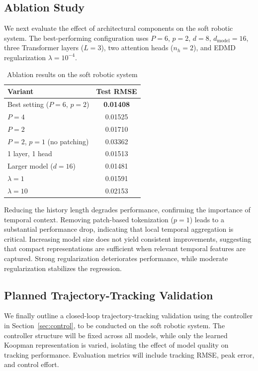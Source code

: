 \documentclass[journal]{IEEEtran}
\begin{document}
\subsection{Ablation Study}

We next evaluate the effect of architectural components on the soft robotic system. The best-performing configuration uses $P=6$, $p=2$, $d=8$, $d_{\mathrm{model}}=16$, three Transformer layers ($L=3$), two attention heads ($n_h=2$), and EDMD regularization $\lambda=10^{-4}$.

\begin{table}[!t]
\renewcommand{\arraystretch}{1.2}
\caption{Ablation results on the soft robotic system}
\label{tab:ablation_platform_b}
\centering
\begin{tabular}{p{}c}
\toprule
Variant & Test RMSE \\
\midrule
Best setting ($P=6$, $p=2$) & \textbf{0.01408} \\
$P=4$ & 0.01525 \\
$P=2$ & 0.01710 \\
$P=2$, $p=1$ (no patching) & 0.03362 \\
1 layer, 1 head & 0.01513 \\
Larger model ($d=16$) & 0.01481 \\
$\lambda=1$ & 0.01591 \\
$\lambda=10$ & 0.02153 \\
\bottomrule
\end{tabular}
\end{table}

Reducing the history length degrades performance, confirming the importance of temporal context. Removing patch-based tokenization ($p=1$) leads to a substantial performance drop, indicating that local temporal aggregation is critical. Increasing model size does not yield consistent improvements, suggesting that compact representations are sufficient when relevant temporal features are captured. Strong regularization deteriorates performance, while moderate regularization stabilizes the regression.

\subsection{Planned Trajectory-Tracking Validation}

We finally outline a closed-loop trajectory-tracking validation using the controller in Section~\ref{sec:control}, to be conducted on the soft robotic system. The controller structure will be fixed across all models, while only the learned Koopman representation is varied, isolating the effect of model quality on tracking performance. Evaluation metrics will include tracking RMSE, peak error, and control effort.
\end{document}

